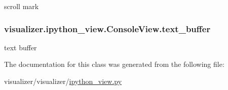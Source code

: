 scroll mark 

\subsubsection[{\texorpdfstring{text\+\_\+buffer}{text_buffer}}]{\setlength{\rightskip}{0pt plus 5cm}visualizer.\+ipython\+\_\+view.\+Console\+View.\+text\+\_\+buffer}\hypertarget{classvisualizer_1_1ipython__view_1_1ConsoleView_af41c734d92634ed48bb4265c383aa12a}{}\label{classvisualizer_1_1ipython__view_1_1ConsoleView_af41c734d92634ed48bb4265c383aa12a}


text buffer 



The documentation for this class was generated from the following file\+:\begin{DoxyCompactItemize}
\item 
visualizer/visualizer/\hyperlink{ipython__view_8py}{ipython\+\_\+view.\+py}\end{DoxyCompactItemize}
